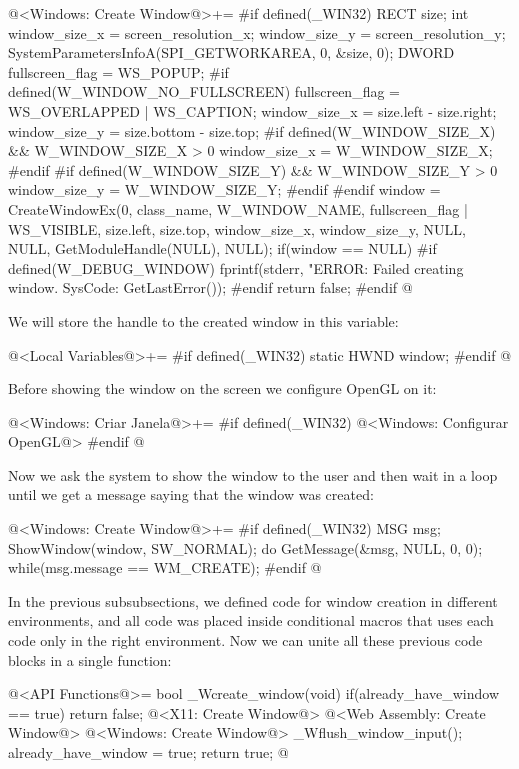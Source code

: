 \iniciocodigo
@<Windows: Create Window@>+=
#if defined(_WIN32)
{
  RECT size;
  int window_size_x = screen_resolution_x;
  window_size_y = screen_resolution_y;
  SystemParametersInfoA(SPI_GETWORKAREA, 0, &size, 0);
  DWORD fullscreen_flag = WS_POPUP;
#if defined(W_WINDOW_NO_FULLSCREEN)
  fullscreen_flag = WS_OVERLAPPED | WS_CAPTION;
  window_size_x = size.left - size.right;
  window_size_y = size.bottom - size.top;
#if defined(W_WINDOW_SIZE_X) && W_WINDOW_SIZE_X > 0
  window_size_x = W_WINDOW_SIZE_X;
#endif
#if defined(W_WINDOW_SIZE_Y) && W_WINDOW_SIZE_Y > 0
  window_size_y = W_WINDOW_SIZE_Y;
#endif
#endif
  window = CreateWindowEx(0, class_name,
                          W_WINDOW_NAME,
                          fullscreen_flag | WS_VISIBLE,
                          size.left, size.top, window_size_x,
                          window_size_y,
                          NULL, NULL,
                          GetModuleHandle(NULL),
                          NULL);
  if(window == NULL){
#if defined(W_DEBUG_WINDOW)
    fprintf(stderr, "ERROR: Failed creating window. SysCode: %
            GetLastError());
#endif
    return false;
  }
}
#endif
@
\fimcodigo

We will store the handle to the created window in this variable:

\iniciocodigo
@<Local Variables@>+=
#if defined(_WIN32)
static HWND window;
#endif
@
\fimcodigo

Before showing the window on the screen we configure OpenGL on it:

\iniciocodigo
@<Windows: Criar Janela@>+=
#if defined(_WIN32)
@<Windows: Configurar OpenGL@>
#endif
@
\fimcodigo

Now we ask the system to show the window to the user and then wait in
a loop until we get a message saying that the window was created:

\iniciocodigo
@<Windows: Create Window@>+=
#if defined(_WIN32)
{
  MSG msg;
  ShowWindow(window, SW_NORMAL);
  do{
    GetMessage(&msg, NULL, 0, 0);
  } while(msg.message == WM_CREATE);
}
#endif
@
\fimcodigo


In the previous subsubsections, we defined code for window creation in
different environments, and all code was placed inside conditional
macros that uses each code only in the right environment. Now we can
unite all these previous code blocks in a single function:

\iniciocodigo
@<API Functions@>=
bool _Wcreate_window(void){
  if(already_have_window == true)
    return false;
  @<X11: Create Window@>
  @<Web Assembly: Create Window@>
  @<Windows: Create Window@>
  _Wflush_window_input();
  already_have_window = true;
  return true;
}
@
\fimcodigo

